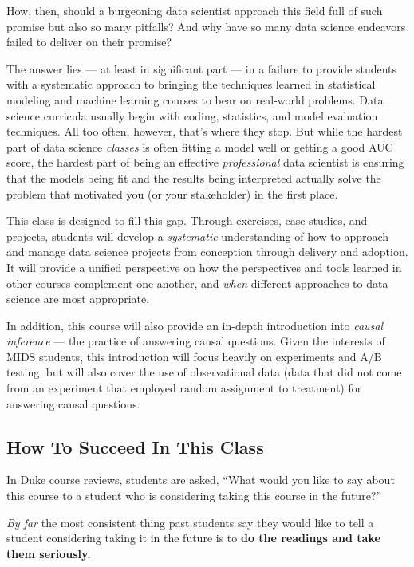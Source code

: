 \documentclass[12pt]{article}
\begin{document}
How, then, should a burgeoning data scientist approach this field full of such promise but also so many pitfalls? And why have so many data science endeavors failed to deliver on their promise?

The answer lies — at least in significant part — in a failure to provide students with a systematic approach to bringing the techniques learned in statistical modeling and machine learning courses to bear on real-world problems. Data science curricula usually begin with coding, statistics, and model evaluation techniques. All too often, however, that's where they stop. But while the hardest part of data science \emph{classes} is often fitting a model well or getting a good AUC score, the hardest part of being an effective \emph{professional} data scientist is ensuring that the models being fit and the results being interpreted actually solve the problem that motivated you (or your stakeholder) in the first place.

This class is designed to fill this gap. Through exercises, case studies, and projects, students will develop a \emph{systematic} understanding of how to approach and manage data science projects from conception through delivery and adoption. It will provide a unified perspective on how the perspectives and tools learned in other courses complement one another, and \emph{when} different approaches to data science are most appropriate. 

In addition, this course will also provide an in-depth introduction into \emph{causal inference} — the practice of answering causal questions. Given the interests of MIDS students, this introduction will focus heavily on experiments and A/B testing, but will also cover the use of observational data (data that did not come from an experiment that employed random assignment to treatment) for answering causal questions.

\subsection{How To Succeed In This Class}

In Duke course reviews, students are asked, ``What would you like to say about this course to a student who is considering taking this course in the future?''

\emph{By far} the most consistent thing past students say they would like to tell a student considering taking it in the future is to \textbf{do the readings and take them seriously.}
\end{document}
